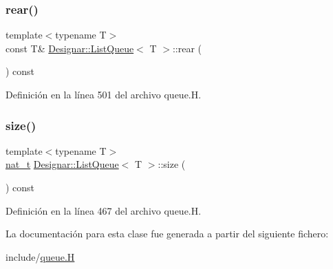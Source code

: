 \subsubsection{\texorpdfstring{rear()}{rear()}\hspace{0.1cm}{\footnotesize\ttfamily [2/2]}}
{\footnotesize\ttfamily template$<$typename T$>$ \\
const T\& \hyperlink{class_designar_1_1_list_queue}{Designar\+::\+List\+Queue}$<$ T $>$\+::rear (\begin{DoxyParamCaption}{ }\end{DoxyParamCaption}) const\hspace{0.3cm}{\ttfamily [inline]}}



Definición en la línea 501 del archivo queue.\+H.

\mbox{\label{class_designar_1_1_list_queue_a0a2d3a25c27b0529b1bcc4b0c0b27855}} 
\subsubsection{\texorpdfstring{size()}{size()}}
{\footnotesize\ttfamily template$<$typename T$>$ \\
\hyperlink{namespace_designar_aa72662848b9f4815e7bf31a7cf3e33d1}{nat\+\_\+t} \hyperlink{class_designar_1_1_list_queue}{Designar\+::\+List\+Queue}$<$ T $>$\+::size (\begin{DoxyParamCaption}{ }\end{DoxyParamCaption}) const\hspace{0.3cm}{\ttfamily [inline]}}



Definición en la línea 467 del archivo queue.\+H.



La documentación para esta clase fue generada a partir del siguiente fichero\+:\begin{DoxyCompactItemize}
\item 
include/\hyperlink{queue_8_h}{queue.\+H}\end{DoxyCompactItemize}
